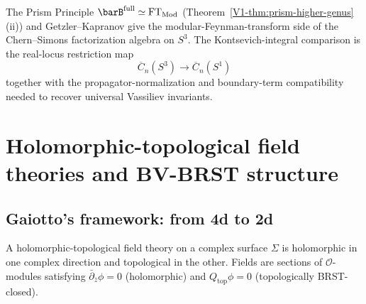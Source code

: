 \begin{remark}
\label{rem:vassiliev}
The Prism Principle
$\barB^{\mathrm{full}} \simeq \mathrm{FT}_{\mathrm{Mod}}$
(Theorem~\ref*{V1-thm:prism-higher-genus}(ii)) and
Getzler--Kapranov \cite{GeK98} give the modular-Feynman-transform
side of the Chern--Simons factorization algebra on $S^3$. The
Kontsevich-integral comparison is the real-locus restriction map
\[
\overline{C}_n(S^3)\longrightarrow \overline{C}_n(S^1)
\]
together with the propagator-normalization and boundary-term
compatibility needed to recover universal Vassiliev invariants.
\end{remark}


\section{Holomorphic-topological field theories and BV-BRST structure}
\label{sec:bv-ht-physics}

\subsection{Gaiotto's framework: from 4d to 2d}

\begin{definition}
A holomorphic-topological field theory on a complex surface $\Sigma$ is holomorphic in one complex direction and topological in the other. Fields are sections of $\mathcal{O}$-modules satisfying $\bar{\partial}_{\bar{z}} \phi = 0$ (holomorphic) and $Q_{\text{top}} \phi = 0$ (topologically BRST-closed).
\end{definition}

